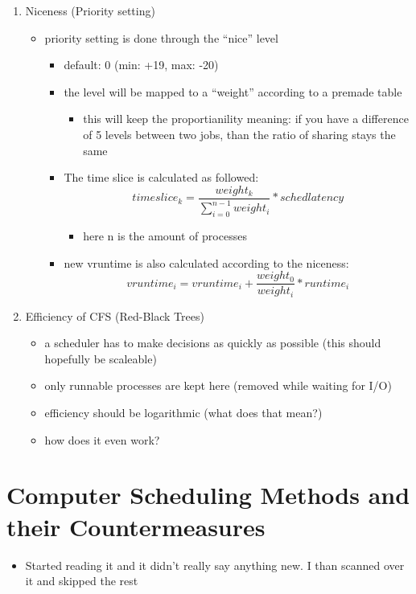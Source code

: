 \documentclass[11pt]{report}
\begin{document}
\begin{enumerate}
\item Niceness (Priority setting)
\label{sec:orgb6d68eb}
\begin{itemize}
\item priority setting is done through the ``nice'' level
\begin{itemize}
\item default: 0 (min: +19, max: -20)
\item the level will be mapped to a ``weight'' according to a premade table
\begin{itemize}
\item this will keep the proportianility
meaning: if you have a difference of 5 levels between two jobs, than the ratio of sharing stays the same
\end{itemize}
\item The time slice is calculated as followed:
$$timeslice_k = \frac{weight_k}{\sum_{i=0}^{n-1} weight_i} * schedlatency$$
\begin{itemize}
\item here n is the amount of processes
\end{itemize}
\item new vruntime is also calculated according to the niceness:
$$vruntime_i = vruntime_i + \frac{weight_0}{weight_i}*runtime_i$$
\end{itemize}
\end{itemize}
\item Efficiency of CFS (Red-Black Trees)
\label{sec:orgfa1c167}
\begin{itemize}
\item a scheduler has to make decisions as quickly as possible (this should hopefully be scaleable)
\item only runnable processes are kept here
(removed while waiting for I/O)
\item efficiency should be logarithmic (what does that mean?)
\item how does it even work?
\end{itemize}
\end{enumerate}
\part{Computer Scheduling Methods and their Countermeasures}
\label{sec:org853bfc0}
\begin{itemize}
\item Started reading it and it didn't really say anything new. I than scanned over it and skipped the rest
\end{itemize}
\end{document}
